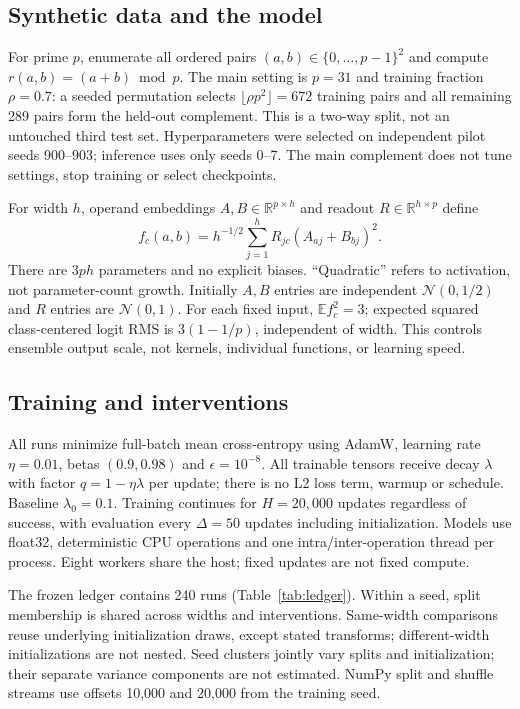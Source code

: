 \documentclass{article}
\begin{document}
\subsection{Synthetic data and the model}
For prime $p$, enumerate all ordered pairs $(a,b)\in\{0,\ldots,p-1\}^2$ and compute $r(a,b)=(a+b)\bmod p$. The main setting is $p=31$ and training fraction $\rho=0.7$: a seeded permutation selects $\lfloor\rho p^2\rfloor=672$ training pairs and all remaining 289 pairs form the held-out complement. This is a two-way split, not an untouched third test set. Hyperparameters were selected on independent pilot seeds 900--903; inference uses only seeds 0--7. The main complement does not tune settings, stop training or select checkpoints.

For width $h$, operand embeddings $A,B\in\mathbb R^{p\times h}$ and readout $R\in\mathbb R^{h\times p}$ define
\begin{equation}
 f_c(a,b)=h^{-1/2}\sum_{j=1}^h R_{jc}(A_{aj}+B_{bj})^2. \label{eq:model}
\end{equation}
There are $3ph$ parameters and no explicit biases. ``Quadratic'' refers to activation, not parameter-count growth. Initially $A,B$ entries are independent $\mathcal N(0,1/2)$ and $R$ entries are $\mathcal N(0,1)$. For each fixed input, $\mathbb E f_c^2=3$; expected squared class-centered logit RMS is $3(1-1/p)$, independent of width. This controls ensemble output scale, not kernels, individual functions, or learning speed.

\subsection{Training and interventions}
All runs minimize full-batch mean cross-entropy using AdamW, learning rate $\eta=0.01$, betas $(0.9,0.98)$ and $\epsilon=10^{-8}$. All trainable tensors receive decay $\lambda$ with factor $q=1-\eta\lambda$ per update; there is no L2 loss term, warmup or schedule. Baseline $\lambda_0=0.1$. Training continues for $H=20{,}000$ updates regardless of success, with evaluation every $\Delta=50$ updates including initialization. Models use float32, deterministic CPU operations and one intra/inter-operation thread per process. Eight workers share the host; fixed updates are not fixed compute.

The frozen ledger contains 240 runs (Table~\ref{tab:ledger}). Within a seed, split membership is shared across widths and interventions. Same-width comparisons reuse underlying initialization draws, except stated transforms; different-width initializations are not nested. Seed clusters jointly vary splits and initialization; their separate variance components are not estimated. NumPy split and shuffle streams use offsets 10,000 and 20,000 from the training seed.
\end{document}
